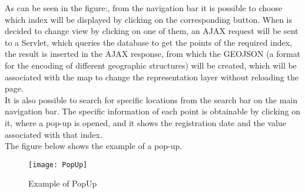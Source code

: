 \documentclass[tesi]{subfiles}
\begin{document}
\noindent As can be seen in the figure:, from the navigation bar it is possible to choose which index will be displayed by clicking on the corresponding button. When is decided to change view by clicking on one of them, an AJAX request will be sent to a Servlet, which queries the database to get the points of the required index, the result is inserted in the AJAX response, from which the GEOJSON (a format for the encoding of different geographic structures) will be created, which will be associated with the map to change the representation layer without reloading the page.\\

\noindent It is also possible to search for specific locations from the search bar on the main navigation bar.
The specific information of each point is obtainable by clicking on it, where a pop-up is opened, and it shows the registration date and the value associated with that index.\\

The figure below shows the example of a pop-up.


\begin{figure}[H]
\centering
\texttt{[image: PopUp]}
\caption{Example of PopUp}
\end{figure}\label{fig:PopUp}
\end{document}
